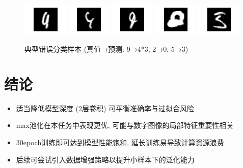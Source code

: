 \documentclass{article}
\begin{document}
			\begin{figure}[htbp]
				\centering
				\includegraphics[width=0.19\textwidth]{figure/error_14_true9_predict4.png}
				\includegraphics[width=0.19\textwidth]{figure/error_21_true9_predict4.png}
				\includegraphics[width=0.19\textwidth]{figure/error_26_true9_predict4.png}
				\includegraphics[width=0.19\textwidth]{figure/error_28_true2_predict0.png}
				\includegraphics[width=0.19\textwidth]{figure/error_29_true5_predict3.png}
				\caption{典型错误分类样本 (真值→预测: 9→4*3, 2→0, 5→3)}
				\label{fig:errors}
			\end{figure}

	\section{结论}
		\begin{itemize}
			\item 适当降低模型深度 (2层卷积) 可平衡准确率与过拟合风险
			\item max池化在本任务中表现更优, 可能与数字图像的局部特征重要性相关
			\item 30epoch训练即可达到模型性能饱和, 延长训练易导致计算资源浪费
			\item 后续可尝试引入数据增强策略以提升小样本下的泛化能力
		\end{itemize}
\end{document}
